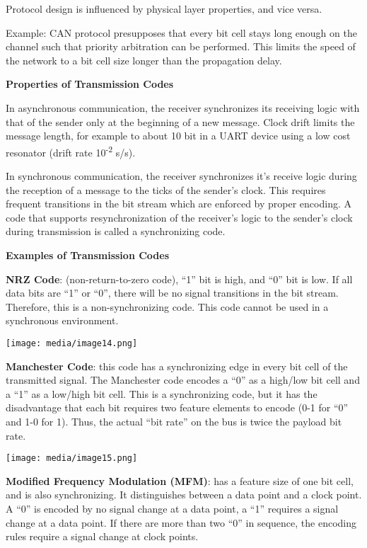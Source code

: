 Protocol design is influenced by physical layer properties, and vice
versa.

Example: CAN protocol presupposes that every bit cell stays long enough
on the channel such that priority arbitration can be performed. This
limits the speed of the network to a bit cell size longer than the
propagation delay.

\textbf{Properties of Transmission Codes}

In asynchronous communication, the receiver synchronizes its receiving
logic with that of the sender only at the beginning of a new message.
Clock drift limits the message length, for example to about 10 bit in a
UART device using a low cost resonator (drift rate
10\textsuperscript{-2} s/s).

In synchronous communication, the receiver synchronizes it's receive
logic during the reception of a message to the ticks of the sender's
clock. This requires frequent transitions in the bit stream which are
enforced by proper encoding. A code that supports resynchronization of
the receiver's logic to the sender's clock during transmission is called
a synchronizing code.

\textbf{Examples of Transmission Codes}

\textbf{NRZ Code}: (non-return-to-zero code), ``1'' bit is high, and
``0'' bit is low. If all data bits are ``1'' or ``0'', there will be no
signal transitions in the bit stream. Therefore, this is a
non-synchronizing code. This code cannot be used in a synchronous
environment.

\texttt{[image: media/image14.png]}

\textbf{Manchester Code}: this code has a synchronizing edge in every
bit cell of the transmitted signal. The Manchester code encodes a ``0''
as a high/low bit cell and a ``1'' as a low/high bit cell. This is a
synchronizing code, but it has the disadvantage that each bit requires
two feature elements to encode (0-1 for ``0'' and 1-0 for 1). Thus, the
actual ``bit rate'' on the bus is twice the payload bit rate.

\texttt{[image: media/image15.png]}

\textbf{Modified Frequency Modulation (MFM)}: has a feature size of one
bit cell, and is also synchronizing. It distinguishes between a data
point and a clock point. A ``0'' is encoded by no signal change at a
data point, a ``1'' requires a signal change at a data point. If there
are more than two ``0'' in sequence, the encoding rules require a signal
change at clock points.


